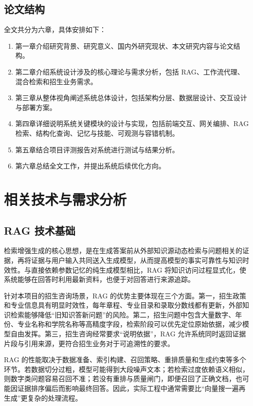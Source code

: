 \documentclass[UTF8,zihao=-4,oneside,fontset=windows]{ctexbook}
\numberwithin{equation}{chapter}
\begin{document}
\section{论文结构}
全文共分为六章，具体安排如下：

\begin{enumerate}
  \item 第一章介绍研究背景、研究意义、国内外研究现状、本文研究内容与论文结构。
  \item 第二章介绍系统设计涉及的核心理论与需求分析，包括 RAG、工作流代理、混合检索和招生业务需求。
  \item 第三章从整体视角阐述系统总体设计，包括架构分层、数据层设计、交互设计与部署方案。
  \item 第四章详细说明系统关键模块的设计与实现，包括前端交互、网关编排、RAG 检索、结构化查询、记忆与技能、可观测与容错机制。
  \item 第五章结合项目评测报告对系统进行测试与结果分析。
  \item 第六章总结全文工作，并提出系统后续优化方向。
\end{enumerate}

\chapter{相关技术与需求分析}

\section{RAG 技术基础}
检索增强生成的核心思想，是在生成答案前从外部知识源动态检索与问题相关的证据，再将证据与用户输入共同送入生成模型，从而提高模型的事实可靠性与知识时效性\cite{lewis2020rag}。与直接依赖参数记忆的纯生成模型相比，RAG 将知识访问过程显式化，使系统能够在回答时利用最新资料，也便于对回答进行来源追踪。

针对本项目的招生咨询场景，RAG 的优势主要体现在三个方面。第一，招生政策和专业信息具有明显时效性，每年章程、专业目录和录取分数线都有更新，外部知识检索能够降低“旧知识答新问题”的风险。第二，招生问题中包含大量数字、年份、专业名称和学院名称等高精度字段，检索阶段可以优先定位原始依据，减少模型自由发挥。第三，招生咨询经常要求“说明依据”，RAG 允许系统同时返回证据片段与引用来源，更符合招生业务对于可追溯性的要求。

RAG 的性能取决于数据准备、索引构建、召回策略、重排质量和生成约束等多个环节。若数据切分过粗，模型可能得到大段噪声文本；若检索过度依赖语义相似，则数字类问题容易召回不准；若没有重排与质量闸门，即便召回了正确文档，也可能因证据排序偏后而影响最终回答。因此，实际工程中通常需要比“向量搜一遍再生成”更复杂的处理流程。
\end{document}
